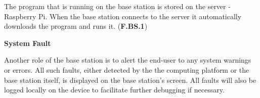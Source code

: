 The program that is running on the base station is stored on the server - Raspberry Pi. When the base station connects to the server it automatically downloads the program and runs it. (\textbf{F.BS.1})

\textbf{System Fault}

Another role of the base station is to alert the end-user to any system warnings or errors. All such faults, either detected by the the computing platform or the base station itself, is displayed on the base station's screen. All faults will also be logged locally on the device to facilitate further debugging if necessary.
